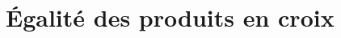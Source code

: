\documentclass[12pt,a4paper]{article}
\date{}
\title{}
\begin{document}





%

%
%
%
%
%
%

\setcounter{section}{3}

\section{\'Egalité des produits en croix}



\setcounter{section}{3}
\end{document}
